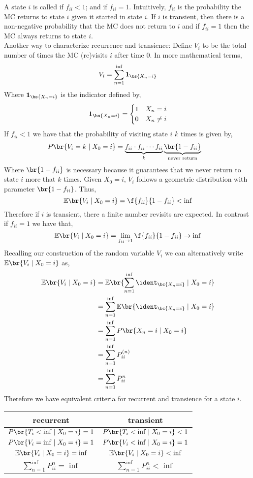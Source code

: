 \documentclass{article}
\newcommand{\Exp}{\mathbb{E}}
\newcommand{\ind}{\mathbf{1}}
\begin{document}
A state $i$ is called  if $f_{ii} < 1$; and  if $f_{ii} = 1$. Intuitively, $f_{ii}$ is the probability the MC returns to state $i$ given it started in state $i$. If $i$ is transient, then there is a non-negative probability that the MC does not return to $i$ and if $f_{ii} = 1$ then the MC always returns to state $i$.\\

Another way to characterize recurrence and transience: Define $V_i$ to be the total number of times the MC (re)visits $i$ after time $0$. In more mathematical terms,
\[ V_i = \sum_{n=1}^{\inf} \ind_{\bs{X_n = i}} \]
Where $\ind_{\bs{X_n = i}}$ is the indicator defined by,
\[ \ind_{\bs{X_n = i}} = \begin{cases}
    1 & X_n = i \\
    0 & X_n \neq i
\end{cases} \]
If $f_{ii} < 1$ we have that the probability of visiting state $i$ $k$ times is given by,
\begin{align*}
    P\br{V_i = k \mid X_0 = i} &= \underbrace{f_{ii} \cdot f_{ii} \cdots f_{ii}}_{k}\underbrace{\br{1 - f_{ii}}}_{\text{never return}}
\end{align*}
Where $\br{1 - f_{ii}}$ is necessary because it guarantees that we never return to state $i$ more that $k$ times. Given $X_0 = i$, $V_i$ follows a geometric distribution with parameter $\br{1 - f_{ii}}$. Thus,
\[ \Exp\br{V_i \mid X_0 = i} = \f{f_{ii}}{1 - f_{ii}} < \inf \]
Therefore if $i$ is transient, there a finite number revisits are expected. In contrast if $f_{ii} = 1$ we have that,
\[ \Exp\br{V_i \mid X_0 = i} = \lim_{f_{ii} \to 1}\f{f_{ii}}{1 - f_{ii}} \to \inf \]
Recalling our construction of the random variable $V_i$ we can alternatively write $\Exp\br{V_i \mid X_0 = i}$ as,
\begin{align*}
    \Exp\br{V_i \mid X_0 = i}
    &= \Exp\br{\sum_{n=1}^{\inf} \ident_{\bc{X_n = i}} \mid X_0 = i}  \\
    &= \sum_{n=1}^{\inf}\Exp\br{ \ident_{\bc{X_n = i}} \mid X_0 = i}  \\
    &= \sum_{n=1}^{\inf}P\br{X_n = i \mid X_0 = i}  \\
    &= \sum_{n=1}^{\inf}P_{ii}^{(n)}  \\
    &= \sum_{n=1}^{\inf}P_{ii}^{n}
\end{align*}
Therefore we have equivalent criteria for recurrent and transience for a state $i$.
\begin{center}
    \begin{tabular}{|c|c|}
        \hline
        recurrent & transient \\
        \hline
        $P\br{T_i < \inf \mid X_0 = i} = 1$ & $P\br{T_i < \inf \mid X_0 = i} < 1$ \\
        $P\br{V_i = \inf \mid X_0 = i} = 1$ & $P\br{V_i < \inf \mid X_0 = i} = 1$ \\
        $\Exp\br{V_i \mid X_0 = i} = \inf$ & $\Exp\br{V_i \mid X_0 = i} < \inf$ \\
        $\sum_{n=1}^{\inf}P_{ii}^{n} = \inf$ & $\sum_{n=1}^{\inf}P_{ii}^{n} < \inf$ \\
        \hline
    \end{tabular}
\end{center}
\end{document}
